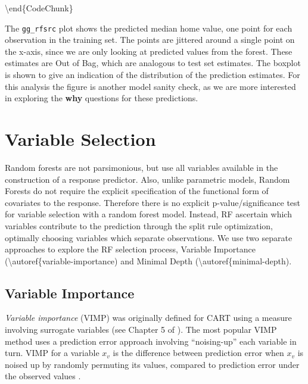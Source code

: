 \documentclass[article]{jss}
\begin{document}
\textbackslash{}end\{CodeChunk\}

The \texttt{gg\_rfsrc} plot shows the predicted median home value, one
point for each observation in the training set. The points are jittered
around a single point on the x-axis, since we are only looking at
predicted values from the forest. These estimates are Out of Bag, which
are analogous to test set estimates. The boxplot is shown to give an
indication of the distribution of the prediction estimates. For this
analysis the figure is another model sanity check, as we are more
interested in exploring the \textbf{why} questions for these
predictions.

\hypertarget{variable-selection}{%
\section{Variable Selection}\label{variable-selection}}

Random forests are not parsimonious, but use all variables available in
the construction of a response predictor. Also, unlike parametric
models, Random Forests do not require the explicit specification of the
functional form of covariates to the response. Therefore there is no
explicit p-value/significance test for variable selection with a random
forest model. Instead, RF ascertain which variables contribute to the
prediction through the split rule optimization, optimally choosing
variables which separate observations. We use two separate approaches to
explore the RF selection process, Variable Importance
(\textbackslash{}autoref\{variable-importance) and Minimal Depth
(\textbackslash{}autoref\{minimal-depth).

\hypertarget{variable-importance}{%
\subsection{Variable Importance}\label{variable-importance}}

\emph{Variable importance} (VIMP) was originally defined for CART using
a measure involving surrogate variables (see Chapter 5 of
\citep{cart:1984}). The most popular VIMP method uses a prediction error
approach involving ``noising-up'' each variable in turn. VIMP for a
variable \(x_v\) is the difference between prediction error when \(x_v\)
is noised up by randomly permuting its values, compared to prediction
error under the observed values \citep[\citet{Liaw:2002},
\citet{Ishwaran:2007}, \citet{Ishwaran:2008}]{Breiman:2001}.
\end{document}
